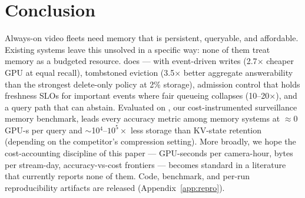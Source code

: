 \section{Conclusion}
\label{sec:conclusion}

Always-on video fleets need memory that is persistent, queryable, and affordable. Existing systems leave this unsolved in a specific way: none of them treat memory as a budgeted resource. \sys does --- with event-driven writes (2.7$\times$ cheaper GPU at equal recall), tombstoned eviction (3.5$\times$ better aggregate answerability than the strongest delete-only policy at 2\% storage), admission control that holds freshness SLOs for important events where fair queueing collapses (10--20$\times$), and a query path that can abstain. Evaluated on \smb, our cost-instrumented surveillance memory benchmark, \sys leads every accuracy metric among memory systems at $\approx$0 GPU-s per query and $\sim$10$^4$--$10^5\times$ less storage than KV-state retention (depending on the competitor's compression setting). More broadly, we hope the cost-accounting discipline of this paper --- GPU-seconds per camera-hour, bytes per stream-day, accuracy-vs-cost frontiers --- becomes standard in a literature that currently reports none of them. Code, benchmark, and per-run reproducibility artifacts are released (Appendix~\ref{app:repro}).

